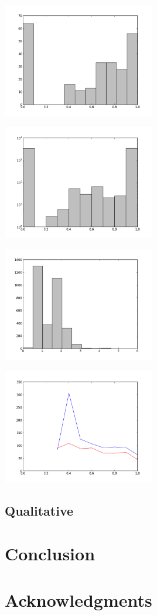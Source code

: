 \documentclass{proc}
\begin{document}
\begin{center}
\includegraphics[width=0.5\textwidth]{images/freecode-unpopular.png}
\end{center}

\begin{center}
\includegraphics[width=0.5\textwidth]{images/freecode-q-histo.png}
\end{center}

\begin{center}
\includegraphics[width=0.5\textwidth]{images/freecode-smallworld-histo.png}
\end{center}

\begin{center}
\includegraphics[width=0.5\textwidth]{images/freecode-graph.png}
\end{center}

\subsection{Qualitative}

\section{Conclusion}
\section{Acknowledgments}



\end{document}
